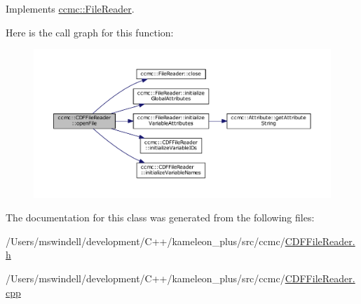 Implements \hyperlink{classccmc_1_1_file_reader_ae4346cb5cf1c4861135d3f293d3da320}{ccmc\-::\-File\-Reader}.



Here is the call graph for this function\-:
\nopagebreak
\begin{figure}[H]
\begin{center}
\leavevmode
\includegraphics[width=350pt]{classccmc_1_1_c_d_f_file_reader_a040e6e9a2c9f8e4aae6673fdc4a92cdb_cgraph}
\end{center}
\end{figure}




The documentation for this class was generated from the following files\-:\begin{DoxyCompactItemize}
\item 
/\-Users/mswindell/development/\-C++/kameleon\-\_\-plus/src/ccmc/\hyperlink{_c_d_f_file_reader_8h}{C\-D\-F\-File\-Reader.\-h}\item 
/\-Users/mswindell/development/\-C++/kameleon\-\_\-plus/src/ccmc/\hyperlink{_c_d_f_file_reader_8cpp}{C\-D\-F\-File\-Reader.\-cpp}\end{DoxyCompactItemize}
